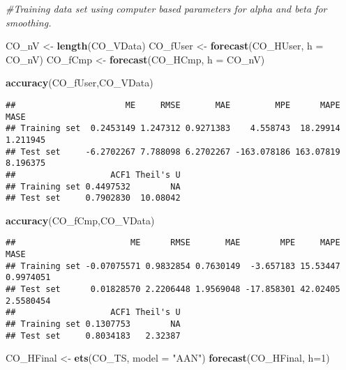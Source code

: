 \documentclass[
]{article}
\newenvironment{Shaded}{\begin{snugshade}}{\end{snugshade}}
\newcommand{\CommentTok}[1]{\textcolor[rgb]{0.56,0.35,0.01}{\textit{#1}}}
\newcommand{\DataTypeTok}[1]{\textcolor[rgb]{0.13,0.29,0.53}{#1}}
\newcommand{\DecValTok}[1]{\textcolor[rgb]{0.00,0.00,0.81}{#1}}
\newcommand{\KeywordTok}[1]{\textcolor[rgb]{0.13,0.29,0.53}{\textbf{#1}}}
\newcommand{\NormalTok}[1]{#1}
\newcommand{\StringTok}[1]{\textcolor[rgb]{0.31,0.60,0.02}{#1}}
\begin{document}
\begin{Shaded}
\begin{Highlighting}[]
\CommentTok{#Training data set using computer based parameters for alpha and beta for smoothing.}
\end{Highlighting}
\end{Shaded}

\begin{Shaded}
\begin{Highlighting}[]
\NormalTok{CO_nV <-}\StringTok{ }\KeywordTok{length}\NormalTok{(CO_VData)}
\NormalTok{CO_fUser <-}\StringTok{ }\KeywordTok{forecast}\NormalTok{(CO_HUser, }\DataTypeTok{h =}\NormalTok{ CO_nV)}
\NormalTok{CO_fCmp <-}\StringTok{ }\KeywordTok{forecast}\NormalTok{(CO_HCmp, }\DataTypeTok{h =}\NormalTok{ CO_nV)}
\end{Highlighting}
\end{Shaded}

\begin{Shaded}
\begin{Highlighting}[]
\KeywordTok{accuracy}\NormalTok{(CO_fUser,CO_VData)}
\end{Highlighting}
\end{Shaded}

\begin{verbatim}
##                      ME     RMSE       MAE         MPE      MAPE     MASE
## Training set  0.2453149 1.247312 0.9271383    4.558743  18.29914 1.211945
## Test set     -6.2702267 7.788098 6.2702267 -163.078186 163.07819 8.196375
##                   ACF1 Theil's U
## Training set 0.4497532        NA
## Test set     0.7902830  10.08042
\end{verbatim}

\begin{Shaded}
\begin{Highlighting}[]
\KeywordTok{accuracy}\NormalTok{(CO_fCmp,CO_VData)}
\end{Highlighting}
\end{Shaded}

\begin{verbatim}
##                       ME      RMSE       MAE        MPE     MAPE      MASE
## Training set -0.07075571 0.9832854 0.7630149  -3.657183 15.53447 0.9974051
## Test set      0.01828570 2.2206448 1.9569048 -17.858301 42.02405 2.5580454
##                   ACF1 Theil's U
## Training set 0.1307753        NA
## Test set     0.8034183   2.32387
\end{verbatim}

\begin{Shaded}
\begin{Highlighting}[]
\NormalTok{CO_HFinal <-}\StringTok{ }\KeywordTok{ets}\NormalTok{(CO_TS, }\DataTypeTok{model =} \StringTok{"AAN"}\NormalTok{)}
\KeywordTok{forecast}\NormalTok{(CO_HFinal, }\DataTypeTok{h=}\DecValTok{1}\NormalTok{)}
\end{Highlighting}
\end{Shaded}
\end{document}
